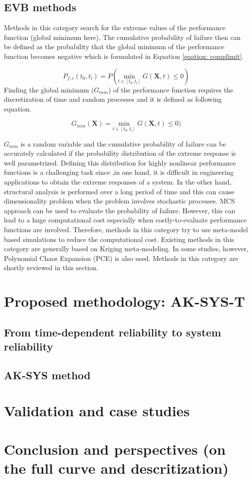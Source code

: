 \subsection{EVB methods}
\noindent
Methods in this category search for the extreme values of the performance function (global minimum here). The cumulative probability of failure then can be 
defined as the probability that the global minimum of the performance function becomes negative which is formulated in Equation \ref{eqation: complimit}. 

\begin{equation}
P_{f,c}(t_0,t_l) =  P(\underset{t \in [t_0, t_l]}{\text{min}} \; G(\textbf{X},t) \leq0 ) 
\label{eqation: complimit}
\end{equation}
\noindent
Finding the global minimum ($G_{min}$) of the performance function requires the discretization of time and random processes and it is defined as following 
equation.

\begin{equation}
G_{min}(\textbf{X})= \underset{t \in [t_0, t_l]}{\text{min}} \; G(\textbf{X},t) \leq0 ) 
\label{eqation: globalmin}
\end{equation}

\noindent
$G_{min}$ is a random variable and the cumulative probability of failure can be accurately calculated if the probability distribution of the extreme response is 
well parametrized. Defining this distribution for highly nonlinear performance functions is a challenging task since ,in one hand, it is difficult in engineering 
applications to obtain the extreme responses of a system. In the other hand, structural analysis is performed over a long period of time and this can cause 
dimensionality problem when the problem involves stochastic processes. MCS approach can be used to evaluate the probability of failure. However, this can lead to
a huge computational cost especially when costly-to-evaluate performance functions are involved. Therefore, methods in this category try to use meta-model based 
simulations to reduce the computational cost. Existing methods in this category are generally based on Kriging meta-modeling. In some studies, however, Polynomial 
Chaos Expansion (PCE) is also used. Methods in this category are shortly reviewed in this section.  






\section{Proposed methodology: AK-SYS-T}
\label{method}
\subsection{From time-dependent reliability to system reliability}
\subsection{AK-SYS method}
\label{sec:ak-sys}
\section{Validation and case studies}
\section{Conclusion and perspectives (on the full curve and descritization)}

